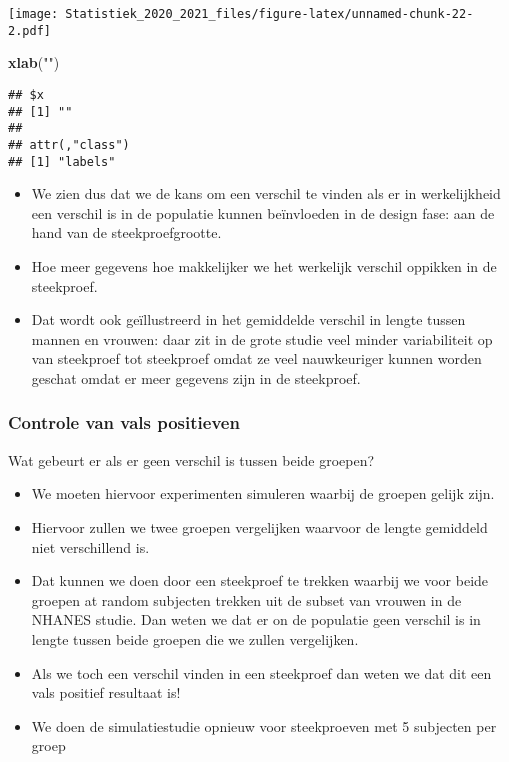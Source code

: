 \documentclass[
  12pt,dutch,coursenotes]{book}
\newenvironment{Shaded}{\begin{snugshade}}{\end{snugshade}}
\newcommand{\KeywordTok}[1]{\textcolor[rgb]{0.13,0.29,0.53}{\textbf{#1}}}
\newcommand{\NormalTok}[1]{#1}
\newcommand{\StringTok}[1]{\textcolor[rgb]{0.31,0.60,0.02}{#1}}
\theoremstyle{definition}
\theoremstyle{definition}
\theoremstyle{definition}
\theoremstyle{remark}
\begin{document}
\texttt{[image: Statistiek\_2020\_2021\_files/figure-latex/unnamed-chunk-22-2.pdf]}

\begin{Shaded}
\begin{Highlighting}[]
\KeywordTok{xlab}\NormalTok{(}\StringTok{""}\NormalTok{)}
\end{Highlighting}
\end{Shaded}

\begin{verbatim}
## $x
## [1] ""
## 
## attr(,"class")
## [1] "labels"
\end{verbatim}

\begin{itemize}
\item
  We zien dus dat we de kans om een verschil te vinden als er in werkelijkheid een verschil is in de populatie kunnen beïnvloeden in de design fase: aan de hand van de steekproefgrootte.
\item
  Hoe meer gegevens hoe makkelijker we het werkelijk verschil oppikken in de steekproef.
\item
  Dat wordt ook geïllustreerd in het gemiddelde verschil in lengte tussen mannen en vrouwen: daar zit in de grote studie veel minder variabiliteit op van steekproef tot steekproef omdat ze veel nauwkeuriger kunnen worden geschat omdat er meer gegevens zijn in de steekproef.
\end{itemize}

\hypertarget{controle-van-vals-positieven}{%
\subsubsection{Controle van vals positieven}\label{controle-van-vals-positieven}}

Wat gebeurt er als er geen verschil is tussen beide groepen?

\begin{itemize}
\item
  We moeten hiervoor experimenten simuleren waarbij de groepen gelijk zijn.
\item
  Hiervoor zullen we twee groepen vergelijken waarvoor de lengte gemiddeld niet verschillend is.
\item
  Dat kunnen we doen door een steekproef te trekken waarbij we voor beide groepen at random subjecten trekken uit de subset van vrouwen in de NHANES studie. Dan weten we dat er on de populatie geen verschil is in lengte tussen beide groepen die we zullen vergelijken.
\item
  Als we toch een verschil vinden in een steekproef dan weten we dat dit een vals positief resultaat is!
\item
  We doen de simulatiestudie opnieuw voor steekproeven met 5 subjecten per groep
\end{itemize}
\end{document}

